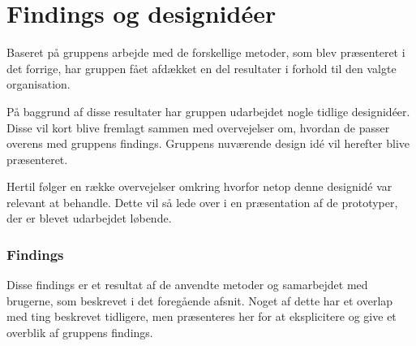 \chapter{Findings og designidéer}
Baseret på gruppens arbejde med de forskellige metoder, som blev præsenteret i det forrige, har gruppen fået afdækket en del resultater i forhold til den valgte organisation. 

På baggrund af disse resultater har gruppen udarbejdet nogle tidlige designidéer. Disse vil kort blive fremlagt sammen med overvejelser om, hvordan de passer overens med gruppens findings. 
Gruppens nuværende design idé vil herefter blive præsenteret. 

Hertil følger en række overvejelser omkring hvorfor netop denne designidé var relevant at behandle. Dette vil så lede over i en præsentation af de prototyper, der er blevet udarbejdet løbende.

\subsection{Findings}
Disse findings er et resultat af de anvendte metoder og samarbejdet med brugerne, som beskrevet i det foregående afsnit. Noget af dette har et overlap med ting beskrevet tidligere, men præsenteres her for at eksplicitere og give et overblik af gruppens findings.

